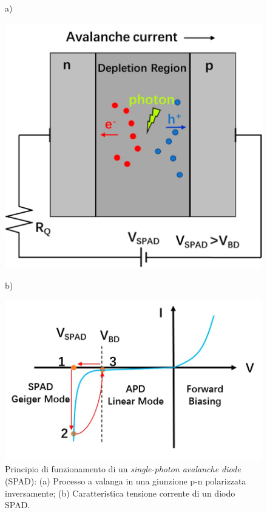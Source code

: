 \begin{figure}[b!]
	\centering
	a)
	\begin{minipage}{.45\textwidth}
		\includegraphics[width=0.8\linewidth]{./ImageFiles/spad_scheme.png}
	\end{minipage}
	b)
	\begin{minipage}{.45\textwidth}
		\includegraphics[width=\linewidth]{./ImageFiles/spad_VI.png}
	\end{minipage}
	\caption{Principio di funzionamento di un \textit{single-photon avalanche diode} (SPAD): (a) Processo a valanga in una giunzione p-n polarizzata inversamente; (b) Caratteristica tensione corrente di un diodo SPAD\cite{Jiang2019}.} 
	\label{fig:spad_VI}
\end{figure}
\newpage
